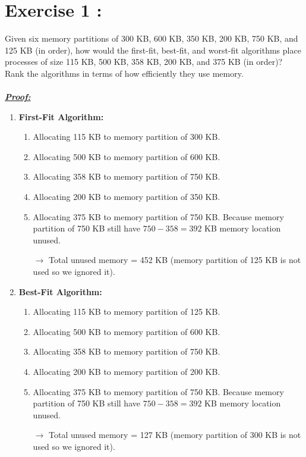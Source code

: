 \documentclass[13pt,a4paper]{article}
\begin{document}
	
	\newpage
	
	
	\section{Exercise 1 :}
		Given six memory partitions of 300 KB, 600 KB, 350 KB, 200 KB, 750 KB, and 125 KB (in order), how would the first-fit, best-fit, and worst-fit algorithms place processes of size 115 KB, 500 KB, 358 KB, 200 KB, and 375 KB (in order)? Rank the algorithms in terms of how efficiently they use memory. \\ \\
		\textit{\underline{\textbf{Proof:}}} 
		\begin{enumerate}[$\ast$]
			\item \textbf{First-Fit Algorithm:}
				\begin{enumerate}[-]
					\item Allocating 115 KB to memory partition of 300 KB.
					\item Allocating 500 KB to memory partition of 600 KB.
					\item Allocating 358 KB to memory partition of 750 KB.
					\item Allocating 200 KB to memory partition of 350 KB.
					\item Allocating 375 KB to memory partition of 750 KB. Because memory partition of 750 KB still have $750 - 358 = 392$ KB memory location unused. 
					\item[$\rightarrow$] Total unused memory = 452 KB (memory partition of 125 KB is not used so we ignored it).
				\end{enumerate}
			\item \textbf{Best-Fit Algorithm:}
				\begin{enumerate}[-]
					\item Allocating 115 KB to memory partition of 125 KB.
					\item Allocating 500 KB to memory partition of 600 KB.
					\item Allocating 358 KB to memory partition of 750 KB.
					\item Allocating 200 KB to memory partition of 200 KB.
					\item Allocating 375 KB to memory partition of 750 KB. Because memory partition of 750 KB still have $750 - 358 = 392$ KB memory location unused. 
					\item[$\rightarrow$] Total unused memory = 127 KB (memory partition of 300 KB is not used so we ignored it).

\end{enumerate}
\end{enumerate}
\end{document}
